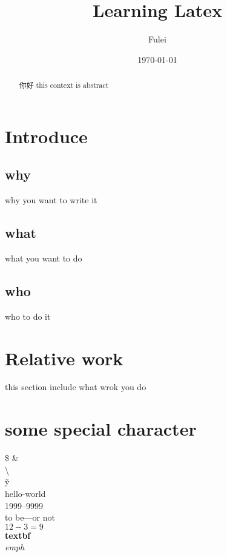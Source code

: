 \documentclass{article}
\begin{document}
\title{Learning Latex}
\author{Fulei}
\date{\today}
\maketitle

\tableofcontents

\newpage
\begin{abstract}
你好
this context is abstract
\end{abstract}

\newpage %
\section{Introduce}
\subsection{why}
why you want to write it
\subsection{what}
what you want to do
\subsection{who}
who to do it

\newpage
\section{Relative work}
this section include what wrok you do 

\newpage
\section{some special character}
\$ \& \\ 
\textbackslash \\
\~{y} \\
hello-world \\ 1999--9999 \\ to be---or not \\
$12-3=9$ \\
\textbf{textbf} \\
\emph{emph} \\%
\end{document}
